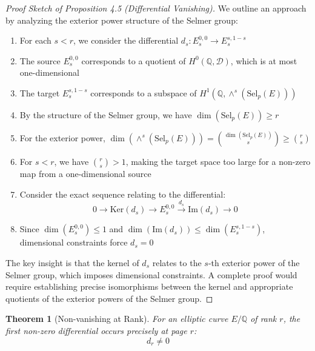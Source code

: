 \documentclass{article}
\theoremstyle{plain}
\newtheorem{theorem}{Theorem}[section]
\theoremstyle{definition}
\theoremstyle{remark}
\begin{document}
\begin{proof}[Proof Sketch of Proposition 4.5 (Differential Vanishing)]
We outline an approach by analyzing the exterior power structure of the Selmer group:

\begin{enumerate}
\item For each $s < r$, we consider the differential $d_s : E_s^{0,0} \to E_s^{s,1-s}$
\item The source $E_s^{0,0}$ corresponds to a quotient of $H^0(\mathbb{Q}, \mathcal{D})$, which is at most one-dimensional
\item The target $E_s^{s,1-s}$ corresponds to a subspace of $H^1(\mathbb{Q}, \wedge^s(\text{Sel}_p(E)))$
\item By the structure of the Selmer group, we have $\dim(\text{Sel}_p(E)) \geq r$
\item For the exterior power, $\dim(\wedge^s(\text{Sel}_p(E))) = \binom{\dim(\text{Sel}_p(E))}{s} \geq \binom{r}{s}$
\item For $s < r$, we have $\binom{r}{s} > 1$, making the target space too large for a non-zero map from a one-dimensional source
\item Consider the exact sequence relating to the differential:
\[
0 \to \text{Ker}(d_s) \to E_s^{0,0} \xrightarrow{d_s} \text{Im}(d_s) \to 0
\]
\item Since $\dim(E_s^{0,0}) \leq 1$ and $\dim(\text{Im}(d_s)) \leq \dim(E_s^{s,1-s})$, dimensional constraints force $d_s = 0$
\end{enumerate}

The key insight is that the kernel of $d_s$ relates to the $s$-th exterior power of the Selmer group, which imposes dimensional constraints. A complete proof would require establishing precise isomorphisms between the kernel and appropriate quotients of the exterior powers of the Selmer group.
\end{proof}

\begin{theorem}[Non-vanishing at Rank]
For an elliptic curve $E/\mathbb{Q}$ of rank $r$, the first non-zero differential occurs precisely at page $r$:
\[
d_r \neq 0
\]
\end{theorem}
\end{document}
